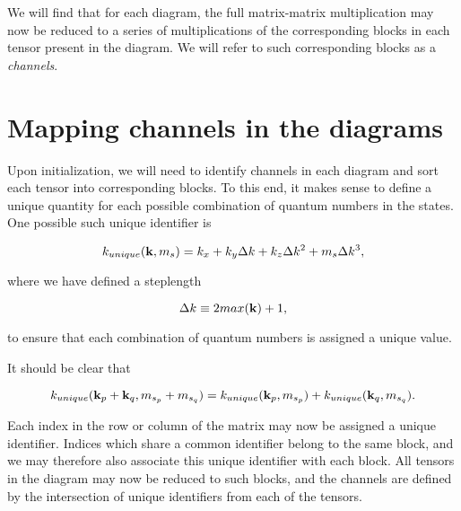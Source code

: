 We will find that for each diagram, the full matrix-matrix
multiplication may now be reduced to a series of multiplications of
the corresponding blocks in each tensor present in the diagram. We
will refer to such corresponding blocks as a \emph{channels}.


\section{Mapping channels in the diagrams}

Upon initialization, we will need to identify channels in each diagram
and sort each tensor into corresponding blocks. To this end, it makes
sense to define a unique quantity for each possible combination of
quantum numbers in the states. One possible such unique identifier is

\begin{equation}
k_{unique}(\bold{k}, m_s) = k_x + k_y\Delta k + k_z \Delta k ^2 + m_s\Delta k^3 ,
\end{equation}

where we have defined a steplength

\begin{equation}
\Delta k \equiv 2 max(\bold{k}) + 1,
\end{equation}

to ensure that each combination of quantum numbers is assigned a unique value. 

It should be clear that

\begin{equation}
k_{unique}(\bold{k}_p + \bold{k}_q, m_{s_p} + m_{s_q}) = k_{unique}(\bold{k}_p, m_{s_p})  + k_{unique}(\bold{k}_q, m_{s_q}) .
\end{equation}

Each index in the row or column of the matrix may now be assigned a
unique identifier. Indices which share a common identifier belong to
the same block, and we may therefore also associate this unique
identifier with each block. All tensors in the diagram may now be
reduced to such blocks, and the channels are defined by the
intersection of unique identifiers from each of the tensors.


